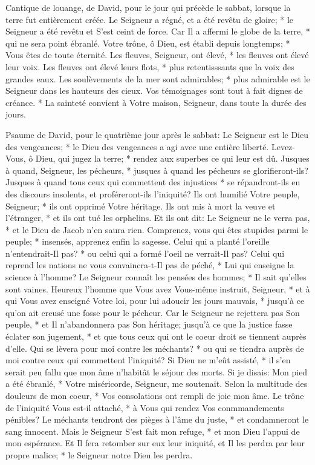 Cantique de louange, de David, pour le jour qui précède le sabbat, lorsque la terre fut entièrement créée. Le Seigneur a régné, et a été revêtu de gloire; * le Seigneur a été revêtu et S'est ceint de force.
Car Il a affermi le globe de la terre, * qui ne sera point ébranlé.
Votre trône, ô Dieu, est établi depuis longtemps; * Vous êtes de toute éternité. Les fleuves, Seigneur, ont élevé, * les fleuves ont élevé leur voix. Les fleuves ont élevé leurs flots, *
plus retentisssants que la voix des grandes eaux. Les soulèvements de la mer sont admirables; * plus admirable est le Seigneur dans les hauteurs des cieux.
Vos témoignages sont tout à fait dignes de créance. * La sainteté convient à Votre maison, Seigneur, dans toute la durée des jours.

Psaume de David, pour le quatrième jour après le sabbat: Le Seigneur est le Dieu des vengeances; * le Dieu des vengeances a agi avec une entière liberté.
Levez-Vous, ô Dieu, qui jugez la terre; * rendez aux superbes ce qui leur est dû.
Jusques à quand, Seigneur, les pécheurs, * jusques à quand les pécheurs se glorifieront-ils?
Jusques à quand tous ceux qui commettent des injustices * se répandront-ils en des discours insolents, et proféreront-ils l'iniquité?
Ils ont humilié Votre peuple, Seigneur; * ils ont opprimé Votre héritage.
Ils ont mis à mort la veuve et l'étranger, * et ils ont tué les orphelins.
Et ils ont dit: Le Seigneur ne le verra pas, * et le Dieu de Jacob n'en saura rien.
Comprenez, vous qui êtes stupides parmi le peuple; * insensés, apprenez enfin la sagesse.
Celui qui a planté l'oreille n'entendrait-Il pas? * ou celui qui a formé l'oeil ne verrait-Il pas?
Celui qui reprend les nations ne vous convaincra-t-Il pas de péché, * Lui qui enseigne la science à l'homme?
Le Seigneur connaît les pensées des hommes; * Il sait qu'elles sont vaines.
Heureux l'homme que Vous avez Vous-même instruit, Seigneur, * et à qui Vous avez enseigné Votre loi,
pour lui adoucir les jours mauvais, * jusqu'à ce qu'on ait creusé une fosse pour le pécheur.
Car le Seigneur ne rejettera pas Son peuple, * et Il n'abandonnera pas Son héritage;
jusqu'à ce que la justice fasse éclater son jugement, * et que tous ceux qui ont le coeur droit se tiennent auprès d'elle.
Qui se lèvera pour moi contre les méchants? * ou qui se tiendra auprès de moi contre ceux qui commettent l'iniquité?
Si Dieu ne m'eût assisté, * il s'en serait peu fallu que mon âme n'habitât le séjour des morts.
Si je disais: Mon pied a été ébranlé, * Votre miséricorde, Seigneur, me soutenait.
Selon la multitude des douleurs de mon coeur, * Vos consolations ont rempli de joie mon âme.
Le trône de l'iniquité Vous est-il attaché, * à Vous qui rendez Vos conmmandements pénibles?
Le méchants tendront des pièges à l'âme du juste, * et condamneront le sang innocent.
Mais le Seigneur S'est fait mon refuge, * et mon Dieu l'appui de mon espérance.
Et Il fera retomber sur eux leur iniquité, et Il les perdra par leur propre malice; * le Seigneur notre Dieu les perdra.

